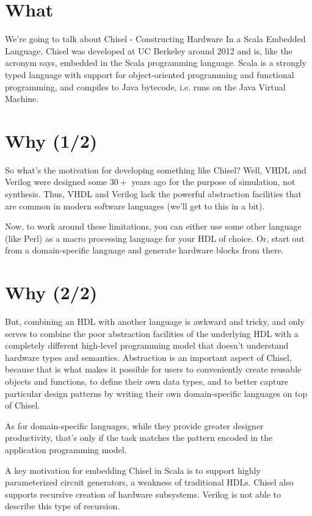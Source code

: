 \documentclass[a4paper,11pt]{article}
\begin{document}
\section{What}

We're going to talk about Chisel - Constructing Hardware In a Scala Embedded Language. Chisel was developed at UC Berkeley around 2012 and is, like the acronym says, embedded in the Scala programming language. Scala is a strongly typed language with support for object-oriented programming and functional programming, and compiles to Java bytecode, i.e. runs on the Java Virtual Machine.

\section{Why (1/2)}

So what's the motivation for developing something like Chisel? Well, VHDL and Verilog were designed some $30+$ years ago for the purpose of simulation, not synthesis. Thus, VHDL and Verilog lack the powerful abstraction facilities that are common in modern software languages (we'll get to this in a bit).

Now, to work around these limitations, you can either use some other language (like Perl) as a macro processing language for your HDL of choice. Or, start out from a domain-specific language and generate hardware blocks from there.

\section{Why (2/2)}

But, combining an HDL with another language is awkward and tricky, and only serves to combine the poor abstraction facilities of the underlying HDL with a completely different high-level programming model that doesn't understand hardware types and semantics. Abstraction is an important aspect of Chisel, because that is what makes it possible for users to conveniently create reusable objects and functions, to define their own data types, and to better capture particular design patterns by writing their own domain-specific languages on top of Chisel.

As for domain-specific languages, while they provide greater designer productivity, that's only if the task matches the pattern encoded in the application programming model.

A key motivation for embedding Chisel in Scala is to support highly parameterized circuit generators, a weakness of traditional HDLs. Chisel also supports recursive creation of hardware subsystems. Verilog is not able to describe this type of recursion.
\end{document}
